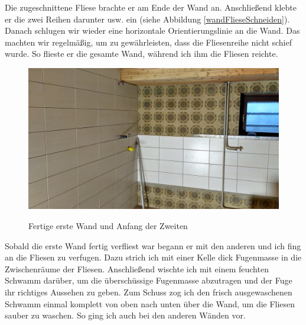 Die zugeschnittene Fliese brachte er am Ende der Wand an. Anschließend klebte er die zwei Reihen darunter usw. ein (siehe Abbildung \ref{wandFlieseSchneiden}). Danach schlugen wir wieder eine horizontale Orientierungslinie an die Wand. Das machten wir regelmäßig, um zu gewährleisten, dass die Fliesenreihe nicht schief wurde. So flieste er die gesamte Wand, während ich ihm die Fliesen reichte.

\begin{figure}[h]
	\begin{center}
		\noindent\includegraphics[scale=0.1]{Resources/Praktikum/IMG_20180806_081011_HDR.jpg}
		\label{ersteWand}
		\caption{Fertige erste Wand und Anfang der Zweiten}	
	\end{center}
\end{figure}

Sobald die erste Wand fertig verfliest war begann er mit den anderen und ich fing an die Fliesen zu verfugen. Dazu strich ich mit einer Kelle dick Fugenmasse in die Zwischenräume der Fliesen. Anschließend wischte ich mit einem feuchten Schwamm darüber, um die überschüssige Fugenmasse abzutragen und der Fuge ihr richtiges Aussehen zu geben. Zum Schuss zog ich den frisch ausgewaschenen Schwamm einmal komplett von oben nach unten über die Wand, um die Fliesen sauber zu waschen. So ging ich auch bei den anderen Wänden vor.

